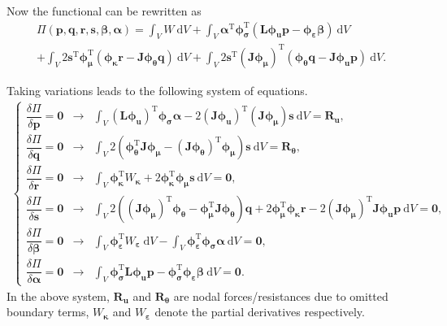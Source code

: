 \documentclass[3p,sort&compress,11pt,fleqn,review]{elsarticle}
\newcommand*{\mb}[1]{\boldsymbol{#1}}
\newcommand*{\mT}{\mathrm{T}}
\newcommand*{\md}[1]{\mathrm{d}#1}
\begin{document}
Now the functional can be rewritten as
\begin{multline}\label{eq:functional_new}
\varPi\left(\mb{p},\mb{q},\mb{r},\mb{s},\mb{\beta},\mb{\alpha}\right)=\int_VW~\md{V}
+\int_V\mb{\alpha}^\mT\mb{\phi}_{\mb{\sigma}}^\mT\left(\mb{L}\mb{\phi}_{\mb{u}}\mb{p}-\mb{\phi}_{\mb{\varepsilon}}\mb{\beta}\right)~\md{V}\\
+\int_V2\mb{s}^\mT\mb{\phi}_{\mb{\mu}}^\mT\left(\mb{\phi}_{\mb{\kappa}}\mb{r}-\mb{J}\mb{\phi}_{\mb{\theta}}\mb{q}\right)~\md{V}
+\int_V2\mb{s}^\mT\left(\mb{J}\mb{\phi}_{\mb{\mu}}\right)^\mT\left(\mb{\phi}_{\mb{\theta}}\mb{q}-\mb{J}\mb{\phi}_{\mb{u}}\mb{p}\right)~\md{V}.
\end{multline}

Taking variations leads to the following system of equations.
\begin{gather}\label{eq:stationary}
\left\{
\begin{array}{lll}
\dfrac{\delta\varPi}{\delta{}\mb{p}}=\mb{0}&\longrightarrow&\displaystyle\int_V\left(\mb{L}\mb{\phi}_{\mb{u}}\right)^\mT\mb{\phi}_{\mb{\sigma}}\mb{\alpha}-2\left(\mb{J}\mb{\phi}_{\mb{u}}\right)^\mT\left(\mb{J}\mb{\phi}_{\mb{\mu}}\right)\mb{s}~\md{V}=\mb{R}_{\mb{u}},\\[4mm]
\dfrac{\delta\varPi}{\delta{}\mb{q}}=\mb{0}&\longrightarrow&\displaystyle\int_V2\left(\mb{\phi}_{\mb{\theta}}^\mT\mb{J}\mb{\phi}_{\mb{\mu}}-\left(\mb{J}\mb{\phi}_{\mb{\theta}}\right)^\mT\mb{\phi}_{\mb{\mu}}\right)\mb{s}~\md{V}=\mb{R}_{\mb{\theta}},\\[4mm]
\dfrac{\delta\varPi}{\delta{}\mb{r}}=\mb{0}&\longrightarrow&\displaystyle\int_V\mb{\phi}_{\mb{\kappa}}^\mT{}W_{\mb{\kappa}}+2\mb{\phi}_{\mb{\kappa}}^\mT\mb{\phi}_{\mb{\mu}}\mb{s}~\md{V}=\mb{0},\\[4mm]
\dfrac{\delta\varPi}{\delta{}\mb{s}}=\mb{0}&\longrightarrow&\displaystyle
\int_V2\left(\left(\mb{J}\mb{\phi}_{\mb{\mu}}\right)^\mT\mb{\phi}_{\mb{\theta}}-\mb{\phi}_{\mb{\mu}}^\mT\mb{J}\mb{\phi}_{\mb{\theta}}\right)\mb{q}+2\mb{\phi}_{\mb{\mu}}^\mT\mb{\phi}_{\mb{\kappa}}\mb{r}-2\left(\mb{J}\mb{\phi}_{\mb{\mu}}\right)^\mT\mb{J}\mb{\phi}_{\mb{u}}\mb{p}~\md{V}=\mb{0},\\[4mm]
\dfrac{\delta\varPi}{\delta{}\mb{\beta}}=\mb{0}&\longrightarrow&\displaystyle\int_V\mb{\phi}_{\mb{\varepsilon}}^\mT{}W_{\mb{\varepsilon}}~\md{V}
-\int_V\mb{\phi}_{\mb{\varepsilon}}^\mT\mb{\phi}_{\mb{\sigma}}\mb{\alpha}~\md{V}=\mb{0},\\[4mm]
\dfrac{\delta\varPi}{\delta{}\mb{\alpha}}=\mb{0}&\longrightarrow&\displaystyle\int_V\mb{\phi}_{\mb{\sigma}}^\mT\mb{L}\mb{\phi}_{\mb{u}}\mb{p}-\mb{\phi}_{\mb{\sigma}}^\mT\mb{\phi}_{\mb{\varepsilon}}\mb{\beta}~\md{V}=\mb{0}.
\end{array}
\right.
\end{gather}
In the above system, $\mb{R}_{\mb{u}}$ and $\mb{R}_{\mb{\theta}}$ are nodal forces/resistances due to omitted boundary terms, $W_{\mb{\kappa}}$ and $W_{\mb{\varepsilon}}$ denote the partial derivatives respectively.
\end{document}
